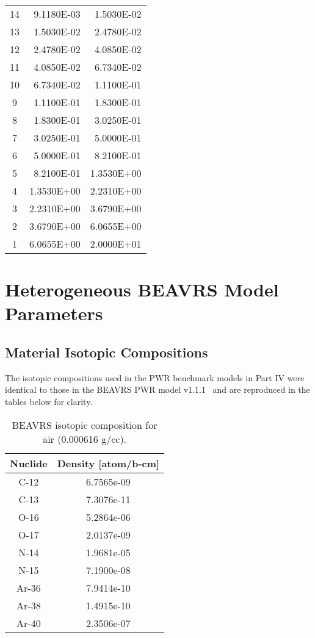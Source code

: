 \begin{appendices}
{\begin{longtable}[h!]{c r r}
14 & 9.1180E-03 & 1.5030E-02 \\
13 & 1.5030E-02 & 2.4780E-02 \\
12 & 2.4780E-02 & 4.0850E-02 \\
11 & 4.0850E-02 & 6.7340E-02 \\
10 & 6.7340E-02 & 1.1100E-01 \\
9 & 1.1100E-01 & 1.8300E-01 \\
8 & 1.8300E-01 & 3.0250E-01 \\
7 & 3.0250E-01 & 5.0000E-01 \\
6 & 5.0000E-01 & 8.2100E-01 \\
5 & 8.2100E-01 & 1.3530E+00 \\
4 & 1.3530E+00 & 2.2310E+00 \\
3 & 2.2310E+00 & 3.6790E+00 \\
2 & 3.6790E+00 & 6.0655E+00 \\
1 & 6.0655E+00 & 2.0000E+01 \\
  \bottomrule
\end{longtable}}


\chapter{Heterogeneous BEAVRS Model Parameters}
\label{app:beavrs-benchmarks}


\section{Material Isotopic Compositions}
\label{sec:beavrs-materials}

The isotopic compositions used in the \ac{PWR} benchmark models in Part IV were identical to those in the \ac{BEAVRS} \ac{PWR} model v1.1.1~\cite{horelik2013beavrs} and are reproduced in the tables below for clarity.

\begin{table}[h!]
  \centering
  \caption[BEAVRS isotopic composition for air]{BEAVRS isotopic composition for air (0.000616 g/cc).}
  \footnotesize
  \label{table:chap7-beavrs-isotopes-air}
  \vspace{6pt}
  \begin{tabular}{c c}
  \toprule
  \rowcolor{lightgray}
  {\bf Nuclide} &
  {\bf Density [atom/b-cm]} \\
  \midrule
  C-12 & 6.7565e-09 \\
  C-13 & 7.3076e-11 \\
  O-16 & 5.2864e-06 \\
  O-17 & 2.0137e-09 \\
  N-14 & 1.9681e-05 \\
  N-15 & 7.1900e-08 \\
  Ar-36 & 7.9414e-10 \\
  Ar-38 & 1.4915e-10 \\
  Ar-40 & 2.3506e-07 \\
  \bottomrule
\end{tabular}
\end{table}


\end{appendices}
